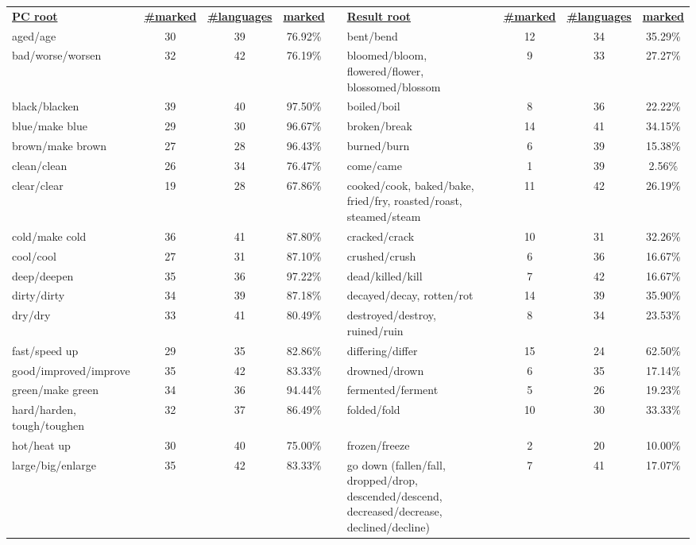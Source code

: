 \begin{tabular}{p{3cm}ccccp{3cm}ccc}
\underline{\textbf{PC root}} & \underline{\textbf{\#marked}} & \underline{\textbf{\#languages}} & \underline{\textbf{marked}} & & \underline{\textbf{Result root}} & \underline{\textbf{\#marked}} & \underline{\textbf{\#languages}} & \underline{\textbf{marked}} \\
aged/age & 30 & 39 & 76.92\% & & bent/bend & 12 & 34 & 35.29\% \\
bad/worse/worsen & 32 & 42 & 76.19\% & & bloomed/bloom, flowered/flower, blossomed/blossom & 9 & 33 & 27.27\% \\
black/blacken & 39 & 40 & 97.50\% & & boiled/boil & 8 & 36 & 22.22\% \\
blue/make blue & 29 & 30 & 96.67\% & & broken/break & 14 & 41 & 34.15\% \\
brown/make brown & 27 & 28 & 96.43\% & & burned/burn & 6 & 39 & 15.38\% \\
clean/clean & 26 & 34 & 76.47\% & & come/came & 1 & 39 & 2.56\% \\
clear/clear & 19 & 28 & 67.86\% & & cooked/cook, baked/bake, fried/fry, roasted/roast, steamed/steam & 11 & 42 & 26.19\% \\
cold/make cold & 36 & 41 & 87.80\% & & cracked/crack & 10 & 31 & 32.26\% \\
cool/cool & 27 & 31 & 87.10\% & & crushed/crush & 6 & 36 & 16.67\% \\
deep/deepen & 35 & 36 & 97.22\% & & dead/killed/kill & 7 & 42 & 16.67\% \\
dirty/dirty & 34 & 39 & 87.18\% & & decayed/decay, rotten/rot & 14 & 39 & 35.90\% \\
dry/dry & 33 & 41 & 80.49\% & & destroyed/destroy, ruined/ruin & 8 & 34 & 23.53\% \\
fast/speed up & 29 & 35 & 82.86\% & & differing/differ & 15 & 24 & 62.50\% \\
good/improved/improve & 35 & 42 & 83.33\% & & drowned/drown & 6 & 35 & 17.14\% \\
green/make green & 34 & 36 & 94.44\% & & fermented/ferment & 5 & 26 & 19.23\% \\
hard/harden, tough/toughen & 32 & 37 & 86.49\% & & folded/fold & 10 & 30 & 33.33\% \\
hot/heat up & 30 & 40 & 75.00\% & & frozen/freeze & 2 & 20 & 10.00\% \\
large/big/enlarge & 35 & 42 & 83.33\% & & go down (fallen/fall, dropped/drop, descended/descend, decreased/decrease, declined/decline) & 7 & 41 & 17.07\% \\

\end{tabular}
